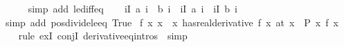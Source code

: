 \begin{isabellebody}
\ \ \ \ \isamarkupfalse%
\ {\isacharparenleft}{\kern0pt}simp\ add{\isacharcolon}{\kern0pt}\ le{\isacharunderscore}{\kern0pt}diff{\isacharunderscore}{\kern0pt}eq{\isacharparenright}{\kern0pt}\isanewline
\ \ \isamarkupfalse%
\ {\isachardoublequoteopen}{\isacharparenleft}{\kern0pt}{\isacharparenleft}{\kern0pt}{\isasymSum}i{\isasymin}I{\isachardot}{\kern0pt}\ a\ i\ {\isacharasterisk}{\kern0pt}\ b\ i{\isacharparenright}{\kern0pt}{\isacharparenright}{\kern0pt}\ {\isasymle}\ {\isacharparenleft}{\kern0pt}{\isasymSum}i{\isasymin}I{\isachardot}{\kern0pt}\ {\isacharparenleft}{\kern0pt}a\ i{\isacharparenright}{\kern0pt}\ {\isacharasterisk}{\kern0pt}\ {\isacharparenleft}{\kern0pt}{\isasymSum}i{\isasymin}I{\isachardot}{\kern0pt}\ {\isacharparenleft}{\kern0pt}b\ i{\isacharparenright}{\kern0pt}\isanewline
\ \ \ \ \isamarkupfalse%
\ {\isacharparenleft}{\kern0pt}simp\ add{\isacharcolon}{\kern0pt}\ pos{\isacharunderscore}{\kern0pt}divide{\isacharunderscore}{\kern0pt}le{\isacharunderscore}{\kern0pt}eq\ True{\isacharparenright}{\kern0pt}\isanewline
{}\isamarkupfalse%
%
\endisatagproof
{\isafoldproof}%
%
\isadelimproof
\isanewline
%
\endisadelimproof
\isanewline
{}\isamarkupfalse%
\ {\isachardoublequoteopen}{\isasymexists}f{\isacharprime}{\kern0pt}{\isachardot}{\kern0pt}\ {\isacharparenleft}{\kern0pt}{\isacharparenleft}{\kern0pt}{\isasymlambda}x{\isachardot}{\kern0pt}\ x{\isacharcircum}{\kern0pt}{}\ {\isacharplus}{\kern0pt}\ x\ has{\isacharunderscore}{\kern0pt}real{\isacharunderscore}{\kern0pt}derivative\ f{\isacharprime}{\kern0pt}\ x{\isacharparenright}{\kern0pt}\ {\isacharparenleft}{\kern0pt}at\ x{\isacharparenright}{\kern0pt}\ {\isasymand}\ P\ {\isacharparenleft}{\kern0pt}{\isasymlambda}x{\isachardot}{\kern0pt}\ f{\isacharprime}{\kern0pt}\ x{\isacharparenright}{\kern0pt}{\isachardoublequoteclose}\isanewline
%
\isadelimproof
\ \ %
\endisadelimproof
%
\isatagproof
{}\isamarkupfalse%
\ {\isacharparenleft}{\kern0pt}rule\ exI\ conjI\ derivative{\isacharunderscore}{\kern0pt}eq{\isacharunderscore}{\kern0pt}intros\ {\isacharbar}{\kern0pt}\ simp{\isacharparenright}{\kern0pt}{\isacharplus}{\kern0pt}\isanewline
\ \ \isamarkupfalse%
%
\endisatagproof
{\isafoldproof}%
%
\isadelimproof
\isanewline
%
\endisadelimproof
\isanewline

\end{isabellebody}
